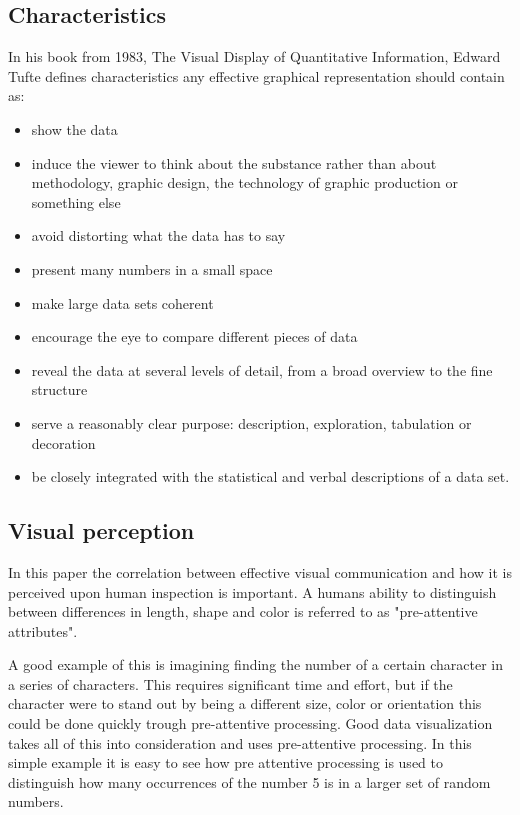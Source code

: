 \subsection{Characteristics}
\label{characteristics}
In his book from 1983, The Visual Display of Quantitative Information\cite{tufte}, Edward Tufte defines characteristics any effective graphical representation should contain as:

\begin{itemize}
\item show the data
\item induce the viewer to think about the substance rather than about methodology, graphic design, the technology of graphic production or something else
\item avoid distorting what the data has to say
\item present many numbers in a small space
\item make large data sets coherent
\item encourage the eye to compare different pieces of data
\item reveal the data at several levels of detail, from a broad overview to the fine structure
\item serve a reasonably clear purpose: description, exploration, tabulation or decoration
\item be closely integrated with the statistical and verbal descriptions of a data set.
\end{itemize}

\subsection{Visual perception}
In this paper the correlation between effective visual communication and how it is perceived upon human inspection is important. A humans ability to distinguish between differences in length, shape and color is referred to as "pre-attentive attributes".  

A good example of this is imagining finding the number of a certain character in a series of characters. This requires significant time and effort, but if the character were to stand out by being a different size, color or orientation this could be done quickly trough pre-attentive processing. Good data visualization takes all of this into consideration and uses pre-attentive processing. In this simple example it is easy to see how pre attentive processing is used to distinguish how many occurrences of the number 5 is in a larger set of random numbers. 
\newline

